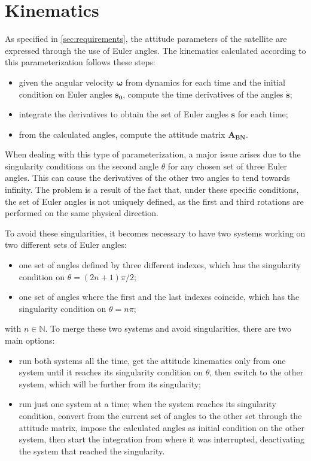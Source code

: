 \section{Kinematics}
\label{sec:kinematics}

As specified in \autoref{sec:requirements}, the attitude parameters of the satellite are expressed through the use of Euler angles. The kinematics calculated according to this parameterization follows these steps:

\begin{itemize}[wide,itemsep=3pt,topsep=3pt]
    \item given the angular velocity $\boldsymbol{\omega}$ from dynamics for each time and the initial condition on Euler angles $\boldsymbol{s_0}$, compute the time derivatives of the angles $\boldsymbol{\dot{s}}$;
    \item integrate the derivatives to obtain the set of Euler angles $\boldsymbol{s}$ for each time;
    \item from the calculated angles, compute the attitude matrix $\boldsymbol{A_{BN}}$.
\end{itemize}

When dealing with this type of parameterization, a major issue arises due to the singularity conditions on the second angle $\theta$ for any chosen set of three Euler angles. This can cause the derivatives of the other two angles to tend towards infinity. The problem is a result of the fact that, under these specific conditions, the set of Euler angles is not uniquely defined, as the first and third rotations are performed on the same physical direction.

To avoid these singularities, it becomes necessary to have two systems working on two different sets of Euler angles:

\begin{itemize}[wide,itemsep=3pt,topsep=3pt]
    \item one set of angles defined by three different indexes, which has the singularity condition on $\theta = (2n+1) \pi / 2$;
    \item one set of angles where the first and the last indexes coincide, which has the singularity condition on $\theta = n \pi$;
\end{itemize}

with $n \in \mathbb{N}$. To merge these two systems and avoid singularities, there are two main options:

\begin{itemize}[wide,itemsep=3pt,topsep=3pt]
    \item run both systems all the time, get the attitude kinematics only from one system until it reaches its singularity condition on $\theta$, then switch to the other system, which will be further from its singularity;
    \item run just one system at a time; when the system reaches its singularity condition, convert from the current set of angles to the other set through the attitude matrix, impose the calculated angles as initial condition on the other system, then start the integration from where it was interrupted, deactivating the system that reached the singularity.
\end{itemize}

